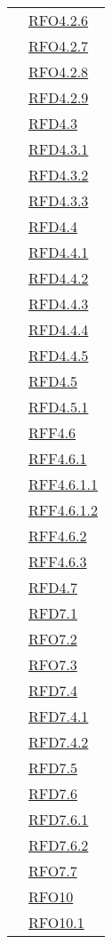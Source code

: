 \begin{longtable}{|>{\centering}m{5cm}|m{5cm}<{\centering}|}
& \hyperlink{RFO4.2.6}{RFO4.2.6}\\
& \hyperlink{RFO4.2.7}{RFO4.2.7}\\
& \hyperlink{RFO4.2.8}{RFO4.2.8}\\
& \hyperlink{RFD4.2.9}{RFD4.2.9}\\
& \hyperlink{RFD4.3}{RFD4.3}\\
& \hyperlink{RFD4.3.1}{RFD4.3.1}\\
& \hyperlink{RFD4.3.2}{RFD4.3.2}\\
& \hyperlink{RFD4.3.3}{RFD4.3.3}\\
& \hyperlink{RFD4.4}{RFD4.4}\\
& \hyperlink{RFD4.4.1}{RFD4.4.1}\\
& \hyperlink{RFD4.4.2}{RFD4.4.2}\\
& \hyperlink{RFD4.4.3}{RFD4.4.3}\\
& \hyperlink{RFD4.4.4}{RFD4.4.4}\\
& \hyperlink{RFD4.4.5}{RFD4.4.5}\\
& \hyperlink{RFD4.5}{RFD4.5}\\
& \hyperlink{RFD4.5.1}{RFD4.5.1}\\
& \hyperlink{RFF4.6}{RFF4.6}\\
& \hyperlink{RFF4.6.1}{RFF4.6.1}\\
& \hyperlink{RFF4.6.1.1}{RFF4.6.1.1}\\
& \hyperlink{RFF4.6.1.2}{RFF4.6.1.2}\\
& \hyperlink{RFF4.6.2}{RFF4.6.2}\\
& \hyperlink{RFF4.6.3}{RFF4.6.3}\\
& \hyperlink{RFD4.7}{RFD4.7}\\
& \hyperlink{RFD7.1}{RFD7.1}\\
& \hyperlink{RFO7.2}{RFO7.2}\\
& \hyperlink{RFO7.3}{RFO7.3}\\
& \hyperlink{RFD7.4}{RFD7.4}\\
& \hyperlink{RFD7.4.1}{RFD7.4.1}\\
& \hyperlink{RFD7.4.2}{RFD7.4.2}\\
& \hyperlink{RFD7.5}{RFD7.5}\\
& \hyperlink{RFD7.6}{RFD7.6}\\
& \hyperlink{RFD7.6.1}{RFD7.6.1}\\
& \hyperlink{RFD7.6.2}{RFD7.6.2}\\
& \hyperlink{RFO7.7}{RFO7.7}\\
& \hyperlink{RFO10}{RFO10}\\
& \hyperlink{RFO10.1}{RFO10.1}\\

\end{longtable}
